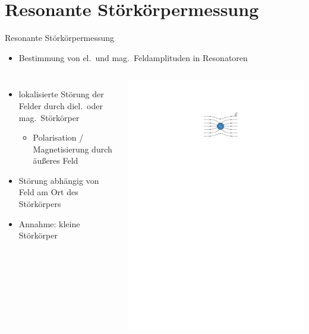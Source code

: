 \documentclass[12pt,xcolor=dvipsnames,professionalfonts]{beamer}
\begin{document}
\section{Resonante Störkörpermessung}

\begin{frame}{Resonante Störkörpermessung}
	\begin{itemize}
		\item Bestimmung von el.\ und mag.\ Feldamplituden in Resonatoren
	\end{itemize}
	\vspace*{0.12cm}
	\begin{columns}[c,onlytextwidth]
		\begin{itemize}
			\setlength\itemsep{1.25em}
			\item lokalisierte Störung der Felder durch diel.\ oder mag.\ Störkörper
			\begin{itemize}
				\item Polarisation / Magnetisierung durch äußeres Feld
			\end{itemize}

			\item Störung abhängig von Feld am Ort des Störkörpers
			
			\item Annahme: kleine Störkörper
		
	\end{itemize}
		\centering
		\includegraphics[scale=1.0]{./figures/stoerung.pdf}
		

\end{columns}
\end{frame}
\end{document}
